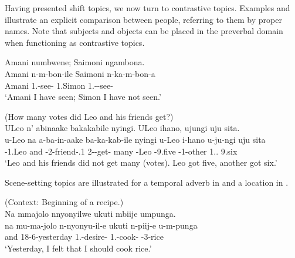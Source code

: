 \documentclass[output=paper]{langscibook}
\begin{document}
Having presented shift topics, we now turn to contrastive topics. Examples  and  illustrate an explicit comparison between people, referring to them by proper names. Note that subjects and objects can be placed in the preverbal domain when functioning as contrastive topics.\pagebreak

\ea
\label{bkm:Ref136344955}
Amani numbwene; Saimoni ngambona.\\
\gll
Amani  n-m-bon-ile  Saimoni  n-ka-m-bon-a\\
Amani  1\SG.\OM{}-see-\PFV{}  1.Simon  1\SG.\SM-\OM{}-see-\FV{}\\
\glt
‘Amani I have seen; Simon I have not seen.’\\

\z


\ea
\label{bkm:Ref136344956}
(How many votes did Leo and his friends get?)\\
ULeo n’ abinaake bakakabile nyingi. ULeo ihano, ujungi uju sita.\\
\gll
u-Leo  na  a-ba-in-aake  ba-ka-kab-ile  nyingi  u-Leo  i-hano  u-ju-ngi  uju  sita\\
\AUG{}-1.Leo  and  \AUG{}-2-friend-\POSS{}.1  2\SM-\NEG{}-get-\PFV{}  many  \AUG{}-Leo  \AUG{}-9.five  \AUG{}-1-other  1.\DEM.\PROX{}  9.six\\
\glt
‘Leo and his friends did not get many (votes). Leo got five, another got six.’

\z

Scene-setting topics are illustrated for a temporal adverb in  and a location in .

\ea
\label{bkm:Ref105322476}
(Context: Beginning of a recipe.)\\
Na mmajolo nnyonyilwe ukuti mbiije umpunga.\\
\gll
na   mu-ma-jolo   n-nyonyu-il-e   ukuti   n-piij-e   u-m-punga\\
and   18-6-yesterday  1\SG.\SM{}-desire-\PFV{}   \COMP{}   1\SG.\SM{}-cook-\SBJV{}   \AUG{}-3-rice\\
\glt
‘Yesterday, I felt that I should cook rice.’\\

\z
\end{document}

